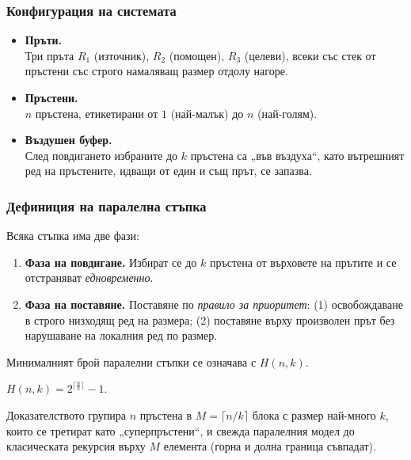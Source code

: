 \subsubsection{Конфигурация на системата}
\begin{itemize}
	\item \textbf{Пръти.}\\
	Три пръта \(R_1\) (източник), \(R_2\) (помощен), \(R_3\) (целеви), всеки със стек от пръстени със строго намаляващ размер отдолу нагоре.
	\item \textbf{Пръстени.}\\
	\(n\) пръстена, етикетирани от \(1\) (най-малък) до \(n\) (най-голям).
	\item \textbf{Въздушен буфер.}\\
	След повдигането избраните до \(k\) пръстена са „във въздуха“, като вътрешният ред на пръстените, идващи от един и същ прът, се запазва.
\end{itemize}

\subsubsection{Дефиниция на паралелна стъпка}\label{subsec:parallel-step}
\hspace*{2.5em}Всяка стъпка има две фази:
\vspace{-0.1cm}
\begin{enumerate}
	\item \textbf{Фаза на повдигане.} Избират се до \(k\) пръстена от върховете на прътите и се отстраняват \emph{едновременно}.
	\item \textbf{Фаза на поставяне.} Поставяне по \emph{правило за приоритет}: (1) освобождаване в строго низходящ ред на размера; (2) поставяне върху произволен прът без нарушаване на локалния ред по размер.
\end{enumerate}
\hspace*{2.5em}Минималният брой паралелни стъпки се означава с \(H(n,k)\).

\begin{Theorem}\label{thm:main}
	$H(n,k) = 2^{\bigl\lceil \textstyle \frac{n}{k} \bigr\rceil} - 1$.
\end{Theorem}

Доказателството групира \(n\) пръстена в \(M=\lceil n/k\rceil\) блока с размер най-много \(k\), които се третират като „суперпръстени“, и свежда паралелния модел до класическата рекурсия върху \(M\) елемента (горна и долна граница съвпадат).

